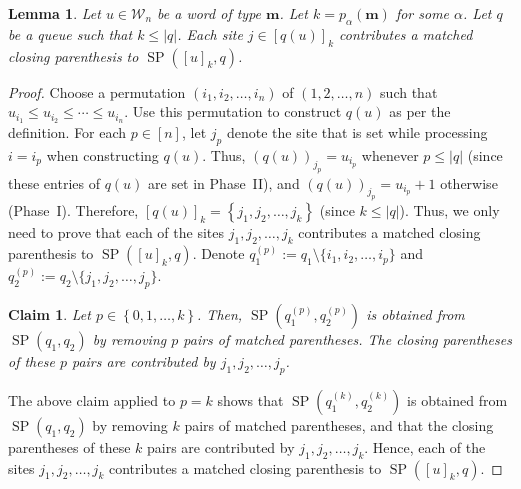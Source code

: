 \documentclass[reqno]{amsart}
\newcommand{\0}{\phantom{c}}
\DeclareMathOperator{\SP}{SP} %
\newcommand{\mm}{\mathbf{m}}
\newcommand{\mcW}{\mathcal{W}}
\newenvironment{subproof}{[\textit{Proof.} }{\hfill$\blacksquare$ ]\medskip}
\newcommand{\set}[1]{\left\{ #1 \right\}}
\newcommand{\abs}[1]{\left| #1 \right|}
\newcommand{\ive}[1]{\left[ #1 \right]}
\theoremstyle{plain}
\newtheorem{lemma}[thm]{Lemma}
\newtheorem{claim}[thm]{Claim}
\theoremstyle{definition}
\numberwithin{equation}{section}
\begin{document}
\begin{lemma} \label{lem:SL.dual.3}
Let $u \in \mcW_n$ be a word of type $\mm$.
Let $k = p_{\alpha}(\mm)$ for some $\alpha$.
Let $q$ be a queue such that $k \leq \abs{q}$.
Each site $j \in \ive{q(u)}_k$ contributes a matched closing parenthesis to $\SP(\ive{u}_k, q)$.
\end{lemma}

\begin{proof}
Choose a permutation $(i_1, i_2, \dotsc, i_n)$ of $(1, 2, \dotsc, n)$ such that $u_{i_1} \leq u_{i_2} \leq \cdots \leq u_{i_n}$.
Use this permutation to construct $q(u)$ as per the definition.
For each $p \in \ive{n}$, let $j_p$ denote the site that is set while processing $i = i_p$ when constructing $q(u)$.
Thus, $(q(u))_{j_p} = u_{i_p}$ whenever $p \leq \abs{q}$ (since these entries of $q(u)$ are set in Phase~II),
and $(q(u))_{j_p} = u_{i_p} + 1$ otherwise (Phase~I).
Therefore, $\ive{q(u)}_k = \set{j_1, j_2, \ldots, j_k}$ (since $k \leq \abs{q}$).
Thus, we only need to prove that each of the sites $j_1, j_2, \ldots, j_k$ contributes a matched closing parenthesis to $\SP(\ive{u}_k, q)$.
Denote $q_1^{(p)} := q_1 \setminus \{i_1, i_2, \dotsc, i_p\}$ and $q_2^{(p)} := q_2 \setminus \{j_1, j_2, \dotsc, j_p\}$.

\begin{claim}
\label{claim:matching_SP}
Let $p \in \set{0, 1, \ldots, k}$.
Then, $\SP(q_1^{(p)}, q_2^{(p)})$ is obtained from $\SP(q_1 , q_2)$ by removing $p$ pairs of matched parentheses.
The closing parentheses of these $p$ pairs are contributed by $j_1, j_2, \ldots, j_p$.
\end{claim}

\begin{subproof}
We shall prove Claim~\ref{claim:matching_SP} by induction on $p$.
The base case ($p = 0$) is obvious.
For the induction step, we assume that Claim~\ref{claim:matching_SP} holds for $p-1$.
The site $j_p$ is chosen in Phase~II (since $p \leq k \leq \abs{q}$), and therefore $j_p$ is the first site weakly to the right of $i_p$ that belongs to $q_2^{(p-1)}$.
Hence, Lemma~\ref{lem:SL.dual.1}
(applied to $q_1^{(p-1)}$, $q_2^{(p-1)}$, $i_p$ and $j_p$ instead of $q_1$, $q_2$, $i$ and $j$)
implies that $\SP(q_1^{(p)}, q_2^{(p)})$ is obtained from $\SP(q_1^{(p-1)}, q_2^{(p-1)})$ by removing a pair of matched parentheses.
Moreover, the closing parenthesis of that pair is contributed by $j_p \in q_2^{(p-1)}$.
Thus, Claim~\ref{claim:matching_SP} follows from the induction hypothesis.
This completes the induction step.
\end{subproof}

The above claim applied to $p = k$ shows that $\SP(q_1^{(k)}, q_2^{(k)})$ is obtained from $\SP(q_1 , q_2)$ by removing $k$ pairs of matched parentheses, and that the closing parentheses of these $k$ pairs are contributed by $j_1, j_2, \ldots, j_k$.
Hence, each of the sites $j_1, j_2, \ldots, j_k$ contributes a matched closing parenthesis to $\SP(\ive{u}_k, q)$.
\end{proof}
\end{document}
